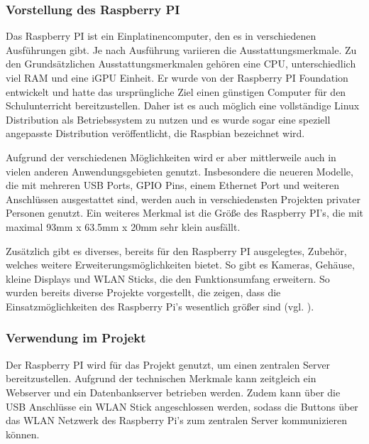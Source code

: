 \subsubsection{Vorstellung des Raspberry PI}        
\label{sec:Vorstellung des Raspberry PI-1} 

Das Raspberry PI ist ein Einplatinencomputer, den es in verschiedenen Ausführungen gibt. Je nach Ausführung variieren die Ausstattungsmerkmale. Zu den Grundsätzlichen Ausstattungsmerkmalen gehören eine \ac{CPU}, unterschiedlich viel \ac{RAM} und eine \ac{iGPU} Einheit. Er wurde von der Raspberry PI Foundation entwickelt und hatte das ursprüngliche Ziel einen günstigen Computer für den Schulunterricht bereitzustellen. Daher ist es auch möglich eine vollständige Linux Distribution als Betriebssystem zu nutzen und es wurde sogar eine speziell angepasste Distribution veröffentlicht, die Raspbian bezeichnet wird. 

Aufgrund der verschiedenen Möglichkeiten wird er aber mittlerweile auch in vielen anderen Anwendungsgebieten genutzt. Insbesondere die neueren Modelle, die mit mehreren \ac{USB} Ports, \ac{GPIO} Pins, einem Ethernet Port und weiteren Anschlüssen ausgestattet sind, werden auch in verschiedensten Projekten privater Personen genutzt. Ein weiteres Merkmal ist die Größe des Raspberry PI's, die mit maximal 93mm x 63.5mm x 20mm sehr klein ausfällt. 

Zusätzlich gibt es diverses, bereits für den Raspberry PI ausgelegtes, Zubehör, welches weitere Erweiterungsmöglichkeiten bietet. So gibt es Kameras, Gehäuse, kleine Displays und \ac{WLAN} Sticks, die den Funktionsumfang erweitern. So wurden bereits diverse Projekte vorgestellt, die zeigen, dass die Einsatzmöglichkeiten des Raspberry Pi's wesentlich größer sind (vgl. \cite{.28.12.2016} \cite{.28.01.2017}).



\subsubsection{Verwendung im Projekt}        
\label{sec:Verwendung des Raspberry PI-1} 
Der Raspberry PI wird für das Projekt genutzt, um einen zentralen Server bereitzustellen. Aufgrund der technischen Merkmale kann zeitgleich ein Webserver und ein Datenbankserver betrieben werden. Zudem kann über die \ac{USB} Anschlüsse ein \ac{WLAN} Stick angeschlossen werden, sodass die Buttons über das \ac{WLAN} Netzwerk des Raspberry Pi's zum zentralen Server kommunizieren können. 

